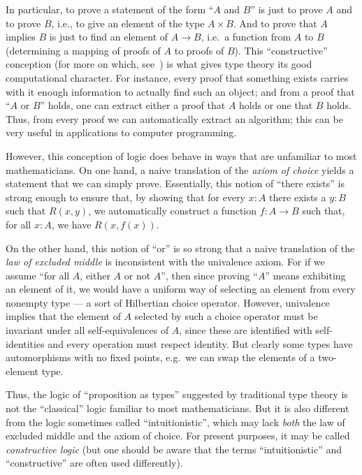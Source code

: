 In particular, to prove a statement of the form ``$A$ and $B$'' is just to prove $A$ and to prove $B$, i.e., to give an element of the type $A\times B$.
And to prove that $A$ implies $B$ is just to find an element of $A\to B$, i.e.\ a function from $A$ to $B$ (determining a mapping of proofs of $A$ to proofs of $B$).
This ``constructive'' conception (for more on which, see~\cite{kolmogorov,TroelstraI,TroelstraII}) is what gives type theory its good 
computational character.
For instance, every proof that something exists carries with it enough information to actually find such an object; and from a proof that  ``$A$ or $B$'' holds, one can extract either a proof that $A$ holds or one that $B$ holds.
Thus, from every proof we can automatically extract an algorithm; this can be very useful in applications to computer programming.

However, this conception of logic does behave in ways that are unfamiliar to most mathematicians.
%
On one hand, a naive translation of the \emph{axiom of choice} yields a statement that we can simply prove.
Essentially, this notion of ``there exists'' is strong enough to ensure that, by showing that for every $x: A$ there exists a $y:B$ such that $R(x,y)$, we automatically construct a function $f : A\to B$ such that, for all $x:A$, we have $R(x, f(x))$.

%
%
On the other hand, this notion of ``or'' is so strong that a naive translation of the \emph{law of excluded middle} is inconsistent with the univalence axiom.
For if we assume ``for all $A$, either $A$ or not $A$'', then since proving ``$A$'' means exhibiting an element of it, we would have a uniform way of selecting an element from every nonempty type --- a sort of Hilbertian choice operator.
However, univalence implies that the element of $A$ selected by such a choice operator must be invariant under all self-equivalences of $A$, since these are identified with self-identities and every operation must respect identity.
But clearly some types have automorphisms with no fixed points, e.g.\ we can swap the elements of a two-element type.
%

Thus, the logic of ``proposition as types'' suggested by traditional type theory is not the ``classical'' logic familiar to most mathematicians.
But it is also different from the logic sometimes called ``intuitionistic'', which may lack \emph{both} the law of excluded middle and the axiom of choice. For present purposes, it may be called \emph{constructive logic} (but one should be aware that the terms  ``intuitionistic'' and ``constructive'' are often used differently).


